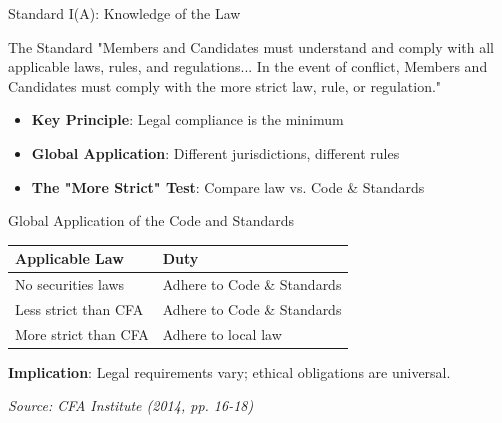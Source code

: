 \documentclass{beamer}
\renewcommand{\small}{\fontsize{7pt}{9pt}\selectfont}
\renewcommand{\footnotesize}{\fontsize{6pt}{8pt}\selectfont}
\begin{document}
	\begin{frame}{Standard I(A): Knowledge of the Law}
		\begin{block}{The Standard}
			"Members and Candidates must understand and comply with all applicable laws, rules, and regulations... In the event of conflict, Members and Candidates must comply with the more strict law, rule, or regulation."
		\end{block}
		
		\begin{itemize}
			\item \textbf{Key Principle}: Legal compliance is the \textcolor{cfablue}{minimum}
			\item \textbf{Global Application}: Different jurisdictions, different rules
			\item \textbf{The "More Strict" Test}: Compare law vs. Code \& Standards
		\end{itemize}
		
		\vspace{0.3cm}
		\begin{center}
		\end{center}
	\end{frame}
	
	\begin{frame}{Global Application of the Code and Standards}
		\begin{table}[]
			\centering
			\small
			\begin{tabular}{|p{3.2cm}|p{3.5cm}|}
				\hline
				\textbf{Applicable Law} & \textbf{Duty} \\
				\hline
				No securities laws & Adhere to Code \& Standards \\
				Less strict than CFA & Adhere to Code \& Standards \\
				More strict than CFA & Adhere to local law \\
				\hline
			\end{tabular}
		\end{table}
		
		\vspace{0.3cm}
		\textbf{Implication}: Legal requirements vary; ethical obligations are universal.
		
		\vspace{0.2cm}
		\footnotesize \textit{Source: CFA Institute (2014, pp. 16-18)}
	\end{frame}
	
\end{document}
